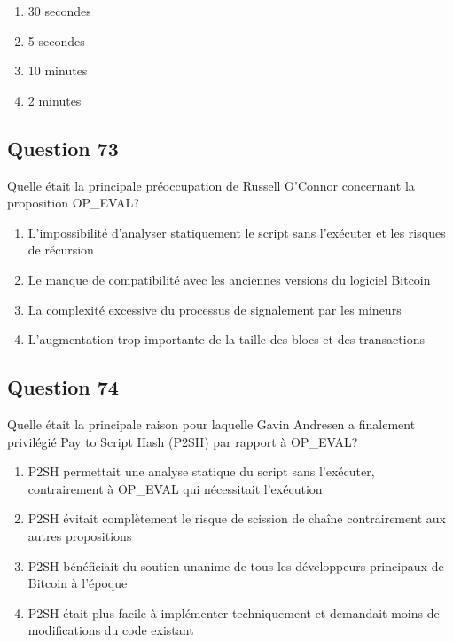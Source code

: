 \documentclass[12pt,a4paper]{article}
\begin{document}
\begin{enumerate}[label=\Alph*., leftmargin=*]
\item 30 secondes
\item 5 secondes
\item 10 minutes
\item 2 minutes
\end{enumerate}

\bigskip


\subsection*{Question 73}
Quelle était la principale préoccupation de Russell O'Connor concernant la proposition OP_EVAL?

\begin{enumerate}[label=\Alph*., leftmargin=*]
\item L'impossibilité d'analyser statiquement le script sans l'exécuter et les risques de récursion
\item Le manque de compatibilité avec les anciennes versions du logiciel Bitcoin
\item La complexité excessive du processus de signalement par les mineurs
\item L'augmentation trop importante de la taille des blocs et des transactions
\end{enumerate}

\bigskip


\subsection*{Question 74}
Quelle était la principale raison pour laquelle Gavin Andresen a finalement privilégié Pay to Script Hash (P2SH) par rapport à OP_EVAL?

\begin{enumerate}[label=\Alph*., leftmargin=*]
\item P2SH permettait une analyse statique du script sans l'exécuter, contrairement à OP_EVAL qui nécessitait l'exécution
\item P2SH évitait complètement le risque de scission de chaîne contrairement aux autres propositions
\item P2SH bénéficiait du soutien unanime de tous les développeurs principaux de Bitcoin à l'époque
\item P2SH était plus facile à implémenter techniquement et demandait moins de modifications du code existant
\end{enumerate}
\end{document}
